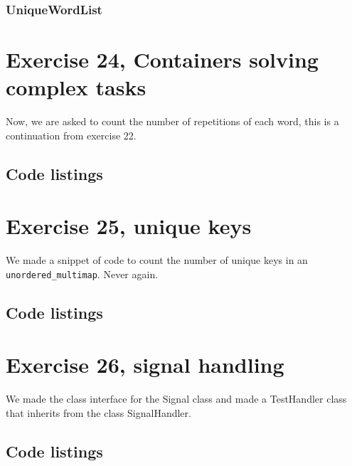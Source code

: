 \documentclass[11pt]{article}
\begin{document}
\subsubsection*{UniqueWordList}












\section*{Exercise 24, Containers solving complex tasks}
Now, we are asked to count the number of repetitions of each word, this is a continuation from exercise 22.

\subsection*{Code listings}



\section*{Exercise 25, unique keys}
We made a snippet of code to count the number of unique keys in an \texttt{unordered\_multimap}.
Never again.

\subsection*{Code listings}


\section*{Exercise 26, signal handling}
We made the class interface for the Signal class and made a TestHandler class that inherits from the class SignalHandler.

\subsection*{Code listings}






 
\end{document}

